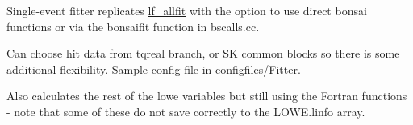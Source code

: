 Single-\/event fitter replicates \mbox{\hyperlink{classlf__allfit}{lf\+\_\+allfit}} with the option to use direct bonsai functions or via the bonsaifit function in bscalls.\+cc.

Can choose hit data from tqreal branch, or SK common blocks so there is some additional flexibility. Sample config file in configfiles/\+Fitter.

Also calculates the rest of the lowe variables but still using the Fortran functions -\/ note that some of these do not save correctly to the LOWE.\+linfo array. 